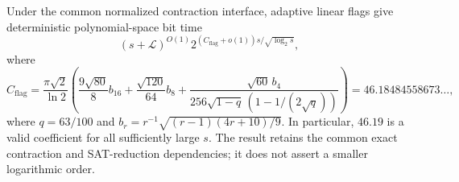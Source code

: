 \begin{theorem}\label{flag:global}
Under the common normalized contraction interface, adaptive linear flags
give deterministic polynomial-space bit time
\[
 (s+\mathcal L)^{O(1)}
 2^{(C_{\mathrm{flag}}+o(1))s/\sqrt{\log_2s}},
\]
where
\begin{equation}\label{flag:constant}
 C_{\mathrm{flag}}
 =\frac{\pi\sqrt2}{\ln2}
 \left(\frac{9\sqrt{80}}8 b_{16}
       +\frac{\sqrt{120}}{64}b_8
       +\frac{\sqrt{60}\,b_4}
        {256\sqrt{1-q}\,(1-1/(2\sqrt q))}\right)
 =46.18484558673\ldots,
\end{equation}
where $q=63/100$ and $b_r=r^{-1}\sqrt{(r-1)(4r+10)/9}$.
In particular, $46.19$ is a valid coefficient for all sufficiently large
$s$. The result retains the common exact contraction and SAT-reduction
dependencies; it does not assert a smaller logarithmic order.
\end{theorem}
